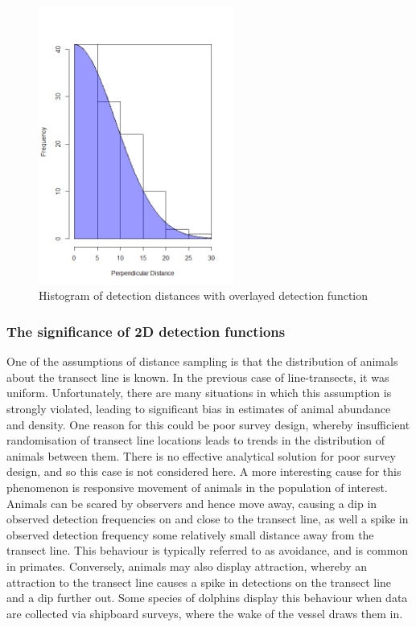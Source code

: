 \documentclass[11pt]{article}
\begin{document}
\begin{multicols}{2}
\begin{figure}[H]
\centering
\includegraphics[width=6.38cm]{DistHistDetec}
\caption{Histogram of detection distances with overlayed detection function}
\end{figure}

\subsubsection{The significance of 2D detection functions}

One of the assumptions of distance sampling is that the distribution of animals about the transect line is known. In the previous case of line-transects, it was uniform. Unfortunately, there are many situations in which this assumption is strongly violated, leading to significant bias in estimates of animal abundance and density. One reason for this could be poor survey design, whereby insufficient randomisation of transect line locations leads to trends in the distribution of animals between them. There is no effective analytical solution for poor survey design, and so this case is not considered here. A more interesting cause for this phenomenon is responsive movement of animals in the population of interest. Animals can be scared by observers and hence move away, causing a dip in observed detection frequencies on and close to the transect line, as well a spike in observed detection frequency some relatively small distance away from the transect line. This behaviour is typically referred to as avoidance, and is common in primates. Conversely, animals may also display attraction, whereby an attraction to the transect line causes a spike in detections on the transect line and a dip further out. Some species of dolphins display this behaviour when data are collected via shipboard surveys, where the wake of the vessel draws them in.


\end{multicols}
\end{document}
